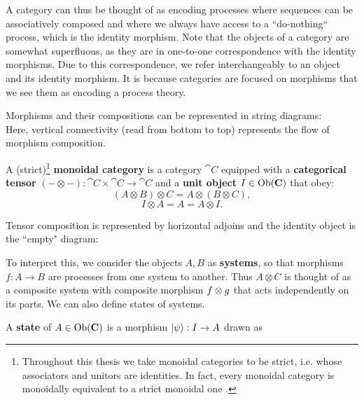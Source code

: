 A category can thus be thought of as encoding processes where sequences can be associatively composed  and where we always have access to a ``do-nothing`` process, which is the identity morphism. Note that the objects of a category are somewhat superfluous, as they are in one-to-one correspondence with the identity morphisms. Due to this correspondence, we refer interchangeably to an object and its identity morphism. It is because categories are focused on morphisms that we see them as encoding a process theory.

Morphisms and their compositions can be represented in string diagrams:
\begin{equation}
\label{eq:composition}

\end{equation}
\noindent Here, vertical connectivity (read from bottom to top) represents the flow of morphism composition.

\begin{defn}
A (strict)\footnote{Throughout this thesis we take monoidal categories to be strict, i.e. whose associators and unitors are identities.  In fact, every monoidal category is monoidally equivalent to a strict monoidal one \cite{joyal1993braided}.} \textbf{monoidal category} is a category $\cat{C}$ equipped with a \textbf{categorical tensor} $(-\otimes-):\cat{C}\times\cat{C}\to\cat{C}$ and a \textbf{unit object} $I\in\mbox{Ob}(\mathbf{C})$ that obey:
\begin{equation}
(A\otimes B)\otimes C = A\otimes(B\otimes C),
\end{equation}
\begin{equation}
I\otimes A = A = A\otimes I.
\end{equation}
\end{defn}

Tensor composition is represented by horizontal adjoins and the identity object is the ``empty" diagram:
\begin{equation}
\label{eq:tensor}

\end{equation}

To interpret this, we consider the objects $A,B$ as \textbf{systems}, so that morphisms $f:A\to B$ are processes from one system to another. Thus $A\otimes C$ is thought of as a composite system with composite morphism $f \otimes g$ that acts independently on its parts. We can also define states of systems.

\begin{defn}
\label{defn:state}
A \textbf{state} of $A\in\mbox{Ob}(\mathbf{C})$ is a morphism $| \psi \rangle:I\to A$ drawn as
\begin{equation}
\label{eq:state}

\end{equation}
\end{defn}

